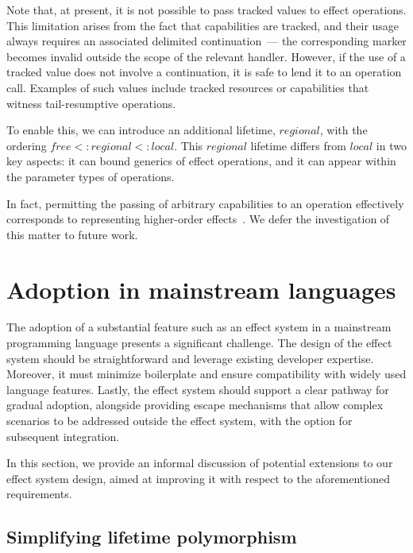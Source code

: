 \documentclass[acmsmall,review,screen]{acmart}
\begin{document}
Note that, at present, it is not possible to pass tracked values to effect operations.
This limitation arises from the fact that capabilities are tracked, and their usage always requires an associated delimited continuation~--- the corresponding marker becomes invalid outside the scope of the relevant handler.
However, if the use of a tracked value does not involve a continuation, it is safe to lend it to an operation call.
Examples of such values include tracked resources or capabilities that witness tail-resumptive operations.

To enable this, we can introduce an additional lifetime, $regional$, with the ordering $free <: regional <: local$.
This $regional$ lifetime differs from $local$ in two key aspects: it can bound generics of effect operations, and it can appear within the parameter types of operations.

In fact, permitting the passing of arbitrary capabilities to an operation effectively corresponds to representing higher-order effects~\cite{wu2014effect, zhang2020handling, van2022handling}.
We defer the investigation of this matter to future work.



\section{Adoption in mainstream languages} \label{sec:mainstream}

The adoption of a substantial feature such as an effect system in a mainstream programming language presents a significant challenge.
The design of the effect system should be straightforward and leverage existing developer expertise.
Moreover, it must minimize boilerplate and ensure compatibility with widely used language features.
Lastly, the effect system should support a clear pathway for gradual adoption, alongside providing escape mechanisms that allow complex scenarios to be addressed outside the effect system, with the option for subsequent integration.

In this section, we provide an informal discussion of potential extensions to our effect system design, aimed at improving it with respect to the aforementioned requirements.

\subsection{Simplifying lifetime polymorphism} \label{subsec:lifetime-poly-enhancement}
\end{document}
